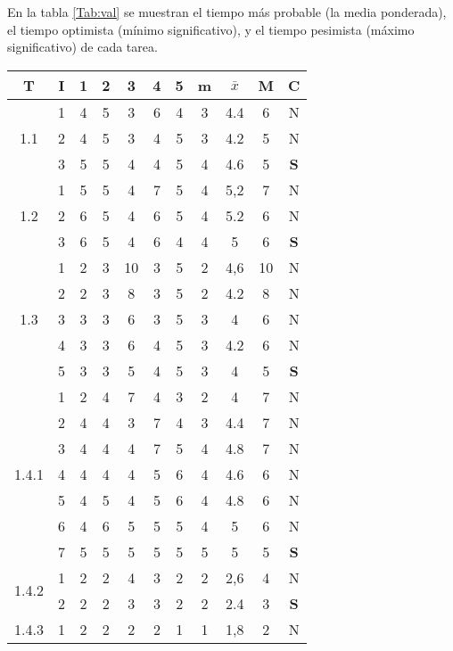 \documentclass[11pt,a4paper,spanish,twoside]{report}
\begin{document}
En la tabla \ref{Tab:val} se muestran el tiempo más probable (la media
ponderada), el tiempo optimista (mínimo significativo), y el tiempo pesimista
(máximo significativo) de cada tarea.
\begin{table}[!h]
\centering
  \begin{tabular}{|c|c||c|c|c|c|c||c|c|c||c|}
    \hline
    \textbf{T} & \textbf{I} & \textbf{1} &
    \textbf{2} & \textbf{3} & \textbf{4} & \textbf{5} & \textbf{m}
    &\textbf{$\bar{x}$} &\textbf{M} & \textbf{C}\\
    \hline \hline
    \multirow{3}{*}{1.1} & 1 & 4 & 5 & 3 & 6 & 4 & 3 & 4.4 & 6 & N \\
    & 2 & 4 & 5 & 3 & 4 & 5 & 3 & 4.2 & 5 & N\\
    & 3 & 5 & 5 & 4 & 4 & 5 & 4 & 4.6 & 5 & \textbf{S}\\
    \hline
    \multirow{3}{*}{1.2} & 1 & 5 & 5 & 4 & 7 & 5 & 4 & 5,2 & 7 & N\\
    & 2 & 6 & 5 & 4 & 6 & 5 & 4 & 5.2 & 6 & N\\
    & 3 & 6 & 5 & 4 & 6 & 4 & 4 & 5 & 6 & \textbf{S} \\    
    \hline
    \multirow{5}{*}{1.3} & 1 & 2 & 3 & 10 & 3 & 5 & 2 & 4,6 & 10& N\\
    & 2 & 2 & 3 & 8 & 3 & 5 & 2 & 4.2 & 8 & N \\
    & 3 & 3 & 3 & 6 & 3 & 5 & 3 & 4 & 6 & N \\
    & 4 & 3 & 3 & 6 & 4 & 5 & 3 & 4.2 & 6 & N \\
    & 5 & 3 & 3 & 5 & 4 & 5 & 3 & 4 & 5 & \textbf{S} \\
    \hline
    \multirow{7}{*}{1.4.1} & 1 & 2 & 4 & 7 & 4 & 3 & 2 & 4 & 7 & N\\
    & 2 & 4 & 4 & 3 & 7 & 4 & 3 & 4.4 & 7 & N \\
    & 3 & 4 & 4 & 4 & 7 & 5 & 4 & 4.8 & 7 & N \\
    & 4 & 4 & 4 & 4 & 5 & 6 & 4 & 4.6 & 6 & N \\
    & 5 & 4 & 5 & 4 & 5 & 6 & 4 & 4.8 & 6 & N \\
    & 6 & 4 & 6 & 5 & 5 & 5 & 4 & 5 & 6 & N \\
    & 7 & 5 & 5 & 5 & 5 & 5 & 5 & 5 & 5 & \textbf{S} \\
    \hline
    \multirow{2}{*}{1.4.2} & 1 & 2 & 2 & 4 & 3 & 2 & 2 & 2,6 & 4 & N\\
    & 2 & 2 & 2 & 3 & 3 & 2 & 2 & 2.4 & 3 & \textbf{S} \\
    \hline
    \multirow{3}{*}{1.4.3} & 1 & 2 & 2 & 2 & 2 & 1 & 1 & 1,8 & 2 & N\\

\end{tabular}
\end{table}
\end{document}
